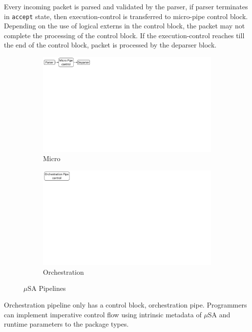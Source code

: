 Every incoming packet is parsed and validated by the parser, if parser terminates in \texttt{accept} state, then execution-control is transferred to micro-pipe control block.
Depending on the use of logical externs in the control block, the packet may not complete the processing of the control block.
If the execution-control reaches till the end of the control block, packet is processed by the deparser block.

\begin{figure}[H]
    \centering
    \begin{subfigure}{0.59\linewidth}
        \centering
        \includegraphics[trim=0 482 692 0, clip,scale=0.45]{msa-pipeline}
        \caption{Micro}
    \end{subfigure}\vline
    \begin{subfigure}{0.41\linewidth}
        \centering
        \includegraphics[trim=0 480 805 0,clip,scale=0.45]{micro-orchestration-pipeline}
        \caption{Orchestration}
    \end{subfigure}
\caption{$\mu$SA Pipelines}
\label{fig:msa-pipelines}
\end{figure}
Orchestration pipeline only has a control block, orchestration pipe.
Programmers can implement imperative control flow using intrinsic metadata of $\mu$SA and runtime parameters to the package types.

